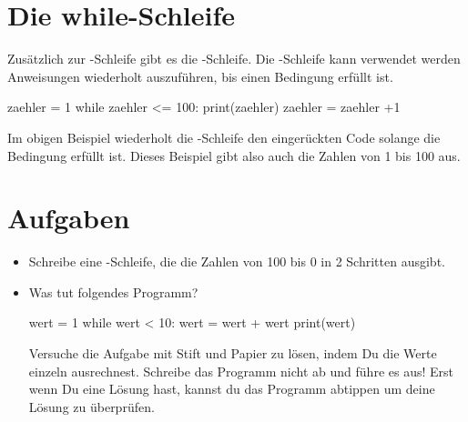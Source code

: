\documentclass{\VorlagenPfad/coderdojokatext}
\begin{document}
\section{Die while-Schleife} Zusätzlich zur -Schleife gibt es die -Schleife. Die -Schleife kann verwendet werden Anweisungen wiederholt auszuführen, bis einen Bedingung erfüllt ist.

\begin{pythoncode}
zaehler = 1
while zaehler <= 100:
	print(zaehler)
	zaehler = zaehler +1
\end{pythoncode}
Im obigen Beispiel wiederholt die -Schleife den eingerückten Code solange die Bedingung  erfüllt ist. Dieses Beispiel gibt also auch die Zahlen von 1 bis 100 aus.


\section{Aufgaben}
\begin{itemize}
	\item Schreibe eine -Schleife, die die Zahlen von 100 bis 0 in 2 Schritten ausgibt.
	\item
	
	Was tut folgendes Programm?
	\\
	
	\begin{pythoncode}
wert = 1
while wert < 10:
	wert = wert + wert
	print(wert)
	\end{pythoncode}
	Versuche die Aufgabe mit Stift und Papier zu lösen, indem Du die Werte einzeln ausrechnest. Schreibe das Programm nicht ab und führe es aus! Erst wenn Du eine Lösung hast, kannst du das Programm abtippen um deine Lösung zu überprüfen.
	
\end{itemize}
\end{document}
